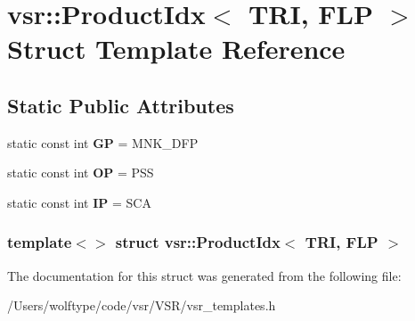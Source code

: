 \hypertarget{structvsr_1_1_product_idx_3_01_t_r_i_00_01_f_l_p_01_4}{\section{vsr\-:\-:Product\-Idx$<$ T\-R\-I, F\-L\-P $>$ Struct Template Reference}
\label{structvsr_1_1_product_idx_3_01_t_r_i_00_01_f_l_p_01_4}
}
\subsection*{Static Public Attributes}
\begin{DoxyCompactItemize}
\item 
\hypertarget{structvsr_1_1_product_idx_3_01_t_r_i_00_01_f_l_p_01_4_afd39e0d6f647f80dc4d3b93881060dcd}{static const int {\bfseries G\-P} = M\-N\-K\-\_\-\-D\-F\-P}\label{structvsr_1_1_product_idx_3_01_t_r_i_00_01_f_l_p_01_4_afd39e0d6f647f80dc4d3b93881060dcd}

\item 
\hypertarget{structvsr_1_1_product_idx_3_01_t_r_i_00_01_f_l_p_01_4_ace71862c5930e1d286dba940d7323f03}{static const int {\bfseries O\-P} = P\-S\-S}\label{structvsr_1_1_product_idx_3_01_t_r_i_00_01_f_l_p_01_4_ace71862c5930e1d286dba940d7323f03}

\item 
\hypertarget{structvsr_1_1_product_idx_3_01_t_r_i_00_01_f_l_p_01_4_a9b73322a0c947fbf4dfc62dd7b7efeda}{static const int {\bfseries I\-P} = S\-C\-A}\label{structvsr_1_1_product_idx_3_01_t_r_i_00_01_f_l_p_01_4_a9b73322a0c947fbf4dfc62dd7b7efeda}

\end{DoxyCompactItemize}
\subsubsection*{template$<$$>$ struct vsr\-::\-Product\-Idx$<$ T\-R\-I, F\-L\-P $>$}



The documentation for this struct was generated from the following file\-:\begin{DoxyCompactItemize}
\item 
/\-Users/wolftype/code/vsr/\-V\-S\-R/vsr\-\_\-templates.\-h\end{DoxyCompactItemize}
